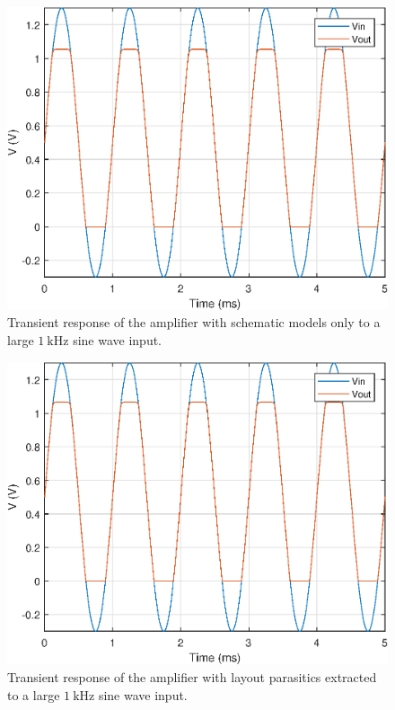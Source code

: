 \documentclass[journal,hidelinks]{IEEEtran}
\begin{document}
\begin{figure}[!htb]
  \centering
  \includegraphics[width=\columnwidth]{figures/schematic/tran_8m.eps}
  \caption{Transient response of the amplifier with schematic models only to a large $\SI{1}{\kilo\hertz}$ sine wave input.}
  \label{fig:sch_tran_8m}
\end{figure}

\begin{figure}[!htb]
  \centering
  \includegraphics[width=\columnwidth]{figures/layout/tran_8m.eps}
  \caption{Transient response of the amplifier with layout parasitics extracted to a large $\SI{1}{\kilo\hertz}$ sine wave input.}
  \label{fig:lay_tran_8m}
\end{figure}
\end{document}
